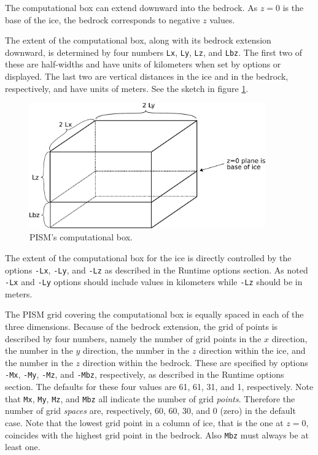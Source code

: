 \documentclass[11pt,final]{amsart}
\renewcommand{\t}[1]{\texttt{#1}}
\begin{document}
The computational box can extend downward into the bedrock.  As $z=0$ is the base of the ice, the bedrock corresponds to negative $z$ values.

The extent of the computational box, along with its bedrock extension downward, is determined by four numbers \t{Lx}, \t{Ly}, \t{Lz}, and \t{Lbz}.  The first two of these are half-widths and have units of kilometers when set by options or displayed.  The last two are vertical distances in the ice and in the bedrock, respectively, and have units of meters.  See the sketch in figure \ref{fig:rectilinearbox}.

\begin{figure}[ht]
\includegraphics[width=4.0in,keepaspectratio=true]{figs/rectilinearbox}
\caption{PISM's computational box.}
\label{fig:rectilinearbox}
\end{figure}

The extent of the computational box for the ice is directly controlled by the options \t{-Lx}, \t{-Ly}, and \t{-Lz} as described in the Runtime options section.  As noted \t{-Lx} and \t{-Ly} options should include values in kilometers while \t{-Lz} should be in meters.

The PISM grid covering the computational box is equally spaced in each of the three dimensions.  Because of the bedrock extension, the grid of points is described by four numbers, namely the number of grid points in the $x$ direction, the number in the $y$ direction, the number in the $z$ direction within the ice, and the number in the $z$ direction within the bedrock.  These are specified by options \verb|-Mx|, \verb|-My|, \verb|-Mz|, and \verb|-Mbz|, respectively, as described in the Runtime options section.  The defaults for these four values are 61, 61, 31, and 1, respectively.  Note that \verb|Mx|, \verb|My|, \verb|Mz|, and \verb|Mbz| all indicate the number of grid \emph{points}.  Therefore the number of grid \emph{spaces} are, respectively, 60, 60, 30, and 0 (zero) in the default case.  Note that the lowest grid point in a column of ice, that is the one at $z=0$, coincides with the highest grid point in the bedrock.  Also \verb|Mbz| must always be at least one.
\end{document}
